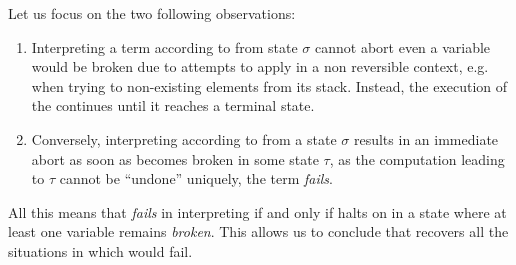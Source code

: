 Let us focus on the two following observations:
\begin{enumerate} 
\item 
Interpreting a \SCORE term  according to \rsemantics from state $\sigma$ cannot abort even 
a variable  would be broken due to attempts to apply  in a non reversible context, e.g. when trying to  non-existing elements from its stack. Instead, the execution of the \rsemantics continues until it reaches a terminal state.

\item 
Conversely, interpreting  according to \asemantics from a state $\sigma$ results in an immediate abort as soon as  becomes broken in some state $\tau$, as the computation leading to $\tau$ cannot be ``undone'' uniquely, the term  \emph{fails}.
\end{enumerate} 
\noindent 
All this means that \asemantics \emph{fails} in interpreting  if and only if \rsemantics halts on  in a state where at least one variable remains \emph{broken}. This allows us to conclude that \rsemantics recovers all the situations in which \asemantics would fail.


